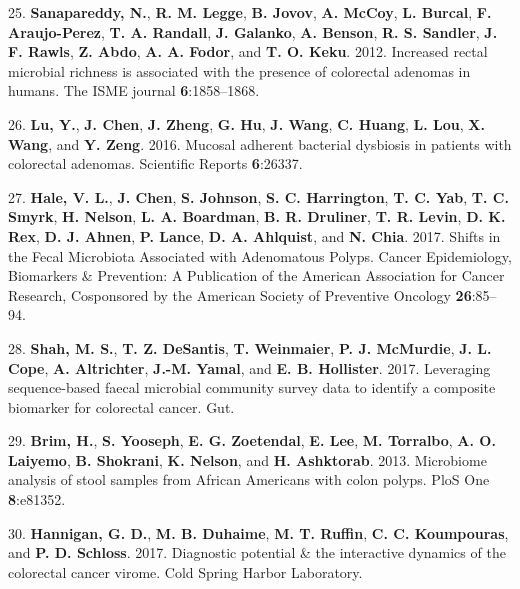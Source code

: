 \documentclass[12pt,]{article}
\begin{document}
\hypertarget{ref-sanapareddy_increased_2012}{}
25. \textbf{Sanapareddy, N.}, \textbf{R. M. Legge}, \textbf{B. Jovov},
\textbf{A. McCoy}, \textbf{L. Burcal}, \textbf{F. Araujo-Perez},
\textbf{T. A. Randall}, \textbf{J. Galanko}, \textbf{A. Benson},
\textbf{R. S. Sandler}, \textbf{J. F. Rawls}, \textbf{Z. Abdo},
\textbf{A. A. Fodor}, and \textbf{T. O. Keku}. 2012. Increased rectal
microbial richness is associated with the presence of colorectal
adenomas in humans. The ISME journal \textbf{6}:1858--1868.

\hypertarget{ref-lu_mucosal_2016}{}
26. \textbf{Lu, Y.}, \textbf{J. Chen}, \textbf{J. Zheng}, \textbf{G.
Hu}, \textbf{J. Wang}, \textbf{C. Huang}, \textbf{L. Lou}, \textbf{X.
Wang}, and \textbf{Y. Zeng}. 2016. Mucosal adherent bacterial dysbiosis
in patients with colorectal adenomas. Scientific Reports
\textbf{6}:26337.

\hypertarget{ref-hale_shifts_2017}{}
27. \textbf{Hale, V. L.}, \textbf{J. Chen}, \textbf{S. Johnson},
\textbf{S. C. Harrington}, \textbf{T. C. Yab}, \textbf{T. C. Smyrk},
\textbf{H. Nelson}, \textbf{L. A. Boardman}, \textbf{B. R. Druliner},
\textbf{T. R. Levin}, \textbf{D. K. Rex}, \textbf{D. J. Ahnen},
\textbf{P. Lance}, \textbf{D. A. Ahlquist}, and \textbf{N. Chia}. 2017.
Shifts in the Fecal Microbiota Associated with Adenomatous Polyps.
Cancer Epidemiology, Biomarkers \& Prevention: A Publication of the
American Association for Cancer Research, Cosponsored by the American
Society of Preventive Oncology \textbf{26}:85--94.

\hypertarget{ref-shah_leveraging_2017}{}
28. \textbf{Shah, M. S.}, \textbf{T. Z. DeSantis}, \textbf{T.
Weinmaier}, \textbf{P. J. McMurdie}, \textbf{J. L. Cope}, \textbf{A.
Altrichter}, \textbf{J.-M. Yamal}, and \textbf{E. B. Hollister}. 2017.
Leveraging sequence-based faecal microbial community survey data to
identify a composite biomarker for colorectal cancer. Gut.

\hypertarget{ref-brim_microbiome_2013}{}
29. \textbf{Brim, H.}, \textbf{S. Yooseph}, \textbf{E. G. Zoetendal},
\textbf{E. Lee}, \textbf{M. Torralbo}, \textbf{A. O. Laiyemo},
\textbf{B. Shokrani}, \textbf{K. Nelson}, and \textbf{H. Ashktorab}.
2013. Microbiome analysis of stool samples from African Americans with
colon polyps. PloS One \textbf{8}:e81352.

\hypertarget{ref-Hannigan2017}{}
30. \textbf{Hannigan, G. D.}, \textbf{M. B. Duhaime}, \textbf{M. T.
Ruffin}, \textbf{C. C. Koumpouras}, and \textbf{P. D. Schloss}. 2017.
Diagnostic potential \& the interactive dynamics of the colorectal
cancer virome. Cold Spring Harbor Laboratory.
\end{document}
